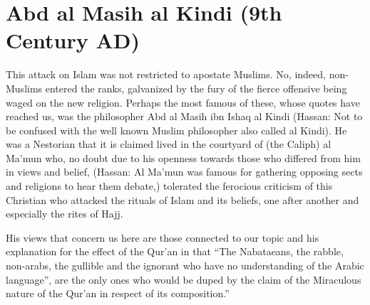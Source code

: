 \documentclass[12pt]{book}
\begin{document}


\section{Abd al Masih al Kindi (9th Century AD)}

This attack on Islam was not restricted to apostate Muslims. No, indeed,
non-Muslims entered the ranks, galvanized by the fury of the fierce offensive
being waged on the new religion. Perhaps the most famous of these, whose quotes
have reached us, was the philosopher Abd al Masih ibn Ishaq al Kindi
(Hassan: Not to be confused with the well known Muslim philosopher also called
al Kindi).
He was a Nestorian that it is claimed lived in the courtyard of (the Caliph)
al Ma’mun who, no doubt due to his openness towards those who differed from him
in views and belief, (Hassan: Al Ma’mun was famous for gathering opposing sects
and religions to hear them debate,) tolerated the ferocious criticism of this
Christian who attacked the rituals of Islam and its beliefs, one after another
and especially the rites of Hajj.

His views that concern us here are those connected to our topic and his
explanation for the effect of the Qur’an in that “The Nabataeans, the rabble,
non-arabs, the gullible and the ignorant who have no understanding of the
Arabic language”, are the only ones who would be duped by the claim of the
Miraculous nature of the Qur’an in respect of its composition.”\footnotemark

\end{document}
